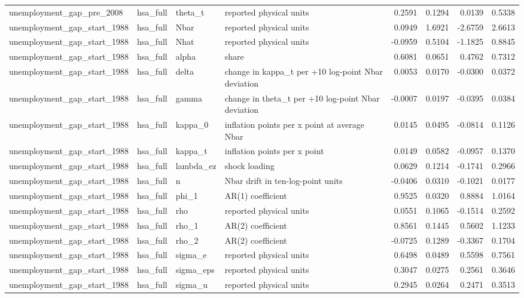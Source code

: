 \begin{tabular}{llllrrrr}
unemployment\_gap\_pre\_2008 & hsa\_full & theta\_t & reported physical units & 0.2591 & 0.1294 & 0.0139 & 0.5338 \\
unemployment\_gap\_start\_1988 & hsa\_full & Nbar & reported physical units & 0.0949 & 1.6921 & -2.6759 & 2.6613 \\
unemployment\_gap\_start\_1988 & hsa\_full & Nhat & reported physical units & -0.0959 & 0.5104 & -1.1825 & 0.8845 \\
unemployment\_gap\_start\_1988 & hsa\_full & alpha & share & 0.6081 & 0.0651 & 0.4762 & 0.7312 \\
unemployment\_gap\_start\_1988 & hsa\_full & delta & change in kappa\_t per +10 log-point Nbar deviation & 0.0053 & 0.0170 & -0.0300 & 0.0372 \\
unemployment\_gap\_start\_1988 & hsa\_full & gamma & change in theta\_t per +10 log-point Nbar deviation & -0.0007 & 0.0197 & -0.0395 & 0.0384 \\
unemployment\_gap\_start\_1988 & hsa\_full & kappa\_0 & inflation points per x point at average Nbar & 0.0145 & 0.0495 & -0.0814 & 0.1126 \\
unemployment\_gap\_start\_1988 & hsa\_full & kappa\_t & inflation points per x point & 0.0149 & 0.0582 & -0.0957 & 0.1370 \\
unemployment\_gap\_start\_1988 & hsa\_full & lambda\_ez & shock loading & 0.0629 & 0.1214 & -0.1741 & 0.2966 \\
unemployment\_gap\_start\_1988 & hsa\_full & n & Nbar drift in ten-log-point units & -0.0406 & 0.0310 & -0.1021 & 0.0177 \\
unemployment\_gap\_start\_1988 & hsa\_full & phi\_1 & AR(1) coefficient & 0.9525 & 0.0320 & 0.8884 & 1.0164 \\
unemployment\_gap\_start\_1988 & hsa\_full & rho & reported physical units & 0.0551 & 0.1065 & -0.1514 & 0.2592 \\
unemployment\_gap\_start\_1988 & hsa\_full & rho\_1 & AR(2) coefficient & 0.8561 & 0.1445 & 0.5602 & 1.1233 \\
unemployment\_gap\_start\_1988 & hsa\_full & rho\_2 & AR(2) coefficient & -0.0725 & 0.1289 & -0.3367 & 0.1704 \\
unemployment\_gap\_start\_1988 & hsa\_full & sigma\_e & reported physical units & 0.6498 & 0.0489 & 0.5598 & 0.7561 \\
unemployment\_gap\_start\_1988 & hsa\_full & sigma\_eps & reported physical units & 0.3047 & 0.0275 & 0.2561 & 0.3646 \\
unemployment\_gap\_start\_1988 & hsa\_full & sigma\_u & reported physical units & 0.2945 & 0.0264 & 0.2471 & 0.3513 \\

\end{tabular}
